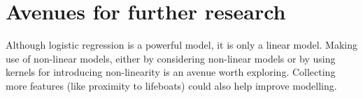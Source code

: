 \documentclass[conference]{IEEEtran}
\begin{document}
\section{Avenues for further research}

Although logistic regression is a powerful model, it is only a linear model. Making use of non-linear models, either by considering non-linear models or by using kernels for introducing non-linearity is an avenue worth exploring. Collecting more features (like proximity to lifeboats) could also help improve modelling.




\nocite{*} %

\end{document}
